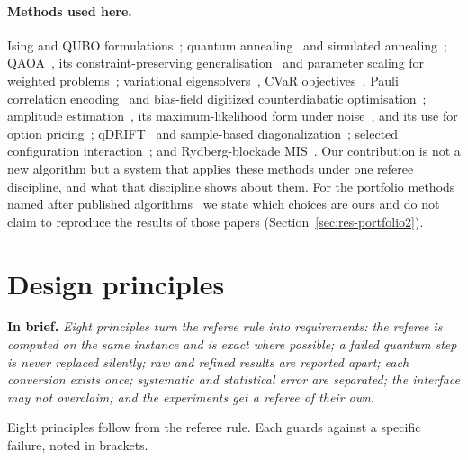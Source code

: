 \documentclass[11pt,a4paper]{article}
\newcommand{\inbrief}[1]{\par\smallskip\noindent\textbf{In brief.} \emph{#1}\par\medskip}
\begin{document}
\paragraph{Methods used here.}
Ising and QUBO formulations~\cite{lucas2014,glover2019}; quantum
annealing~\cite{kadowaki1998,johnson2011} and simulated
annealing~\cite{kirkpatrick1983}; QAOA~\cite{farhi2014}, its
constraint-preserving generalisation~\cite{hadfield2019} and parameter
scaling for weighted problems~\cite{shaydulin2023,sureshbabu2024}; variational
eigensolvers~\cite{peruzzo2014}, CVaR objectives~\cite{barkoutsos2020}, Pauli
correlation encoding~\cite{sciorilli2024} and bias-field digitized
counterdiabatic optimisation~\cite{cadavid2024}; amplitude
estimation~\cite{brassard2002,montanaro2015,suzuki2020,giurgica2022}, its
maximum-likelihood form under noise~\cite{tanaka2021}, and its use for option
pricing~\cite{woerner2019,stamatopoulos2020}; qDRIFT~\cite{campbell2019} and
sample-based diagonalization~\cite{kanno2023,robledo2024,sqdrift2025};
selected configuration interaction~\cite{huron1973,holmes2016}; and
Rydberg-blockade MIS~\cite{pichler2018,ebadi2022,wurtz2023,nguyen2023}. Our
contribution is not a new algorithm but a system that applies these methods
under one referee discipline, and what that discipline shows about them. For
the portfolio methods named after published
algorithms~\cite{barkoutsos2020,sciorilli2024,cadavid2024} we state which
choices are ours and do not claim to reproduce the results of those papers
(Section~\ref{sec:res-portfolio2}).

\section{Design principles}
\label{sec:principles}

\inbrief{Eight principles turn the referee rule into requirements: the
referee is computed on the same instance and is exact where possible; a
failed quantum step is never replaced silently; raw and refined results are
reported apart; each conversion exists once; systematic and statistical
error are separated; the interface may not overclaim; and the experiments
get a referee of their own.}

Eight principles follow from the referee rule. Each guards against a
specific failure, noted in brackets.
\end{document}

